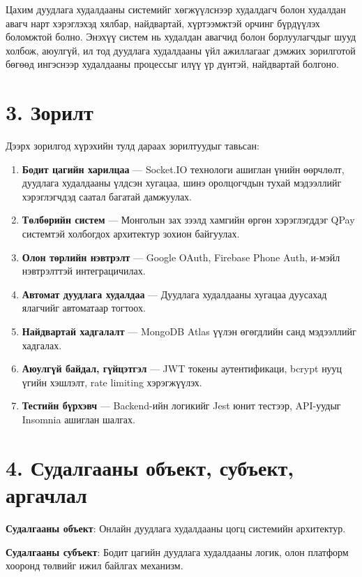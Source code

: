 \documentclass[12pt, a4paper]{report}
\begin{document}
Цахим дуудлага худалдааны системийг хөгжүүлснээр худалдагч болон худалдан авагч нарт хэрэглэхэд хялбар, найдвартай, хүртээмжтэй орчинг бүрдүүлэх боломжтой болно. Энэхүү систем нь худалдан авагчид болон борлуулагчдыг шууд холбож, аюулгүй, ил тод дуудлага худалдааны үйл ажиллагааг дэмжих зорилготой бөгөөд ингэснээр худалдааны процессыг илүү үр дүнтэй, найдвартай болгоно.

\section*{3. Зорилт}

Дээрх зорилгод хүрэхийн тулд дараах зорилтуудыг тавьсан:

\begin{enumerate}
  \item \textbf{Бодит цагийн харилцаа} — Socket.IO технологи ашиглан үнийн өөрчлөлт, дуудлага худалдааны үлдсэн хугацаа, шинэ оролцогчдын тухай мэдээллийг хэрэглэгчдэд саатал багатай дамжуулах.
  \item \textbf{Төлбөрийн систем} — Монголын зах зээлд хамгийн өргөн хэрэглэгддэг QPay системтэй холбогдох архитектур зохион байгуулах.
  \item \textbf{Олон төрлийн нэвтрэлт} — Google OAuth, Firebase Phone Auth, и-мэйл нэвтрэлттэй интеграцичилах.
  \item \textbf{Автомат дуудлага худалдаа} — Дуудлага худалдааны хугацаа дуусахад ялагчийг автоматаар тогтоох.
  \item \textbf{Найдвартай хадгалалт} — MongoDB Atlas үүлэн өгөгдлийн санд мэдээллийг хадгалах.
  \item \textbf{Аюулгүй байдал, гүйцэтгэл} — JWT токены аутентификаци, bcrypt нууц үгийн хэшлэлт, rate limiting хэрэгжүүлэх.
  \item \textbf{Тестийн бүрхэвч} — Backend-ийн логикийг Jest юнит тестээр, API-уудыг Insomnia ашиглан шалгах.
\end{enumerate}

\section*{4. Судалгааны объект, субъект, аргачлал}

\textbf{Судалгааны объект}: Онлайн дуудлага худалдааны цогц системийн архитектур.

\textbf{Судалгааны субъект}: Бодит цагийн дуудлага худалдааны логик, олон платформ хооронд төлвийг ижил байлгах механизм.
\end{document}
